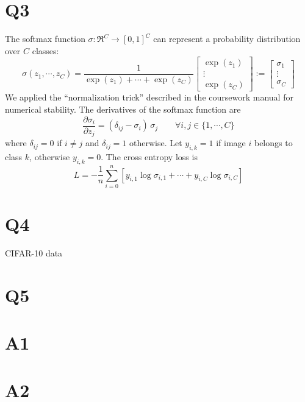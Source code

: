 \documentclass[12pt, a4paper]{article}
\begin{document}
\section*{Q3}
The softmax function $\sigma : \Re^C \rightarrow [0, 1]^C$ can represent a probability distribution over $C$ classes:
\[ \sigma(z_1, \dotsm, z_C) = \frac{1}{\exp(z_1) + \dotsm + \exp(z_C)}
   \begin{bmatrix} \exp(z_1) \\ \vdots \\ \exp(z_C) \end{bmatrix} :=
   \begin{bmatrix} \sigma_1  \\ \vdots \\ \sigma_C  \end{bmatrix} \]
We applied the ``normalization trick'' described in the coursework manual for numerical stability. The derivatives of the softmax function are
\[ \frac{\partial \sigma_i}{\partial z_j} = (\delta_{ij} - \sigma_i) \, \sigma_j \qquad \forall i, j \in \{1, \dotsm, C\} \]
where $\delta_{ij} = 0$ if $i \neq j$ and $\delta_{ij} = 1$ otherwise. Let $y_{i,k} = 1$ if image $i$ belongs to class $k$, otherwise $y_{i,k} = 0$. The cross entropy loss is
\[ L = -\frac1n \sum_{i=0}^n \left[ y_{i,1} \log \sigma_{i,1} + \dotsm + y_{i,C} \log \sigma_{i,C} \right] \]

\section*{Q4}
CIFAR-10 data

\section*{Q5}

\section*{A1}

\section*{A2}
\end{document}
